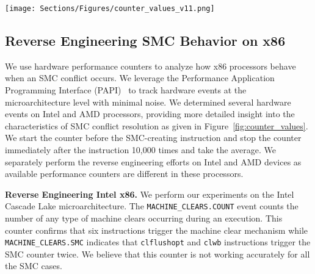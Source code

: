 \begin{figure*}[ht]
    \centering
    {
    \texttt{[image: Sections/Figures/counter\_values\_v11.png]}
    }
    
    \caption{Reverse Engineering SMC behavior on (a), (c) Intel Cascade Lake and (b), (d) AMD Ryzen 5 microarchitectures by using the PAPI~\cite{PAPI} tool. The counters belonging to Intel and AMD processors are separated by the red line.}
    \label{fig:counter_values}
\end{figure*}

\subsection{Reverse Engineering SMC Behavior on x86}\label{sec:reverse}

We use hardware performance counters to analyze how x86 processors behave when an SMC conflict occurs. We leverage the Performance Application Programming Interface (PAPI)~\cite{PAPI} to track hardware events at the microarchitecture level with minimal noise. We determined several hardware events on Intel and AMD processors, providing more detailed insight into the characteristics of SMC conflict resolution as given in Figure~\ref{fig:counter_values}. 
We start the counter before the SMC-creating instruction and stop the counter immediately after the instruction 10,000 times and take the average.
We separately perform the reverse engineering efforts on Intel and AMD devices as available performance counters are different in these processors.

\noindent \textbf{Reverse Engineering Intel x86.} We perform our experiments on the Intel Cascade Lake microarchitecture. The \texttt{MACHINE\_CLEARS.COUNT} event counts the number of any type of machine clears occurring during an execution. This counter confirms that six instructions trigger the machine clear mechanism while \texttt{MACHINE\_CLEARS.SMC} indicates that \texttt{clflushopt} and \texttt{clwb} instructions trigger the SMC counter twice. We believe that this counter is not working accurately for all the SMC cases. 


